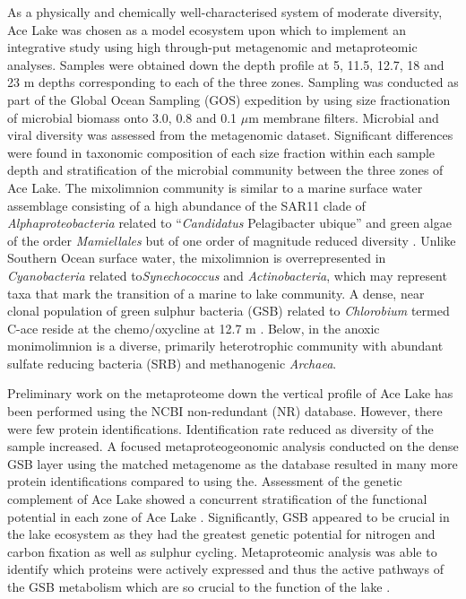 As a physically and chemically well-characterised system of moderate diversity, Ace Lake was chosen as a model ecosystem upon which to implement an integrative study using high through-put metagenomic and metaproteomic analyses.
Samples were obtained down the depth profile at 5, 11.5, 12.7, 18 and 23 m depths corresponding to each of the three zones.
Sampling was conducted as part of the Global Ocean Sampling (GOS) expedition \cite{Rusch2007} by using size fractionation of microbial biomass onto 3.0, 0.8 and 0.1 $\mu$m membrane filters.
Microbial and viral diversity was assessed from the metagenomic dataset.
Significant differences were found in taxonomic composition of each size fraction within each sample depth and stratification of the microbial community between the three zones of Ace Lake.
The mixolimnion community is similar to a marine surface water assemblage consisting of a high abundance of the SAR11 clade of \textit{Alphaproteobacteria} related to ``\textit{Candidatus} Pelagibacter ubique'' and green algae of the order \textit{Mamiellales} but of one order of magnitude reduced diversity \cite{Lauro2011}.
Unlike Southern Ocean surface water, the mixolimnion is overrepresented in \textit{Cyanobacteria} related to\textit{Synechococcus} and \textit{Actinobacteria}, which may represent taxa that mark the transition of a marine to lake community.
A dense, near clonal population of green sulphur bacteria (GSB) related to \textit{Chlorobium} termed C-ace reside at the chemo/oxycline at 12.7 m \cite{Ng2010, Lauro2011}.
Below, in the anoxic monimolimnion is a diverse, primarily heterotrophic community with abundant sulfate reducing bacteria (SRB) and methanogenic \textit{Archaea}.

Preliminary work on the metaproteome down the vertical profile of Ace Lake has been performed using the NCBI non-redundant (NR) database. %
However, there were few protein identifications.
Identification rate reduced as diversity of the sample increased.
A focused metaproteogeonomic analysis conducted on the dense GSB layer using the matched metagenome as the database resulted in many more protein identifications compared to using the\cite{Ng2010}.
Assessment of the genetic complement of Ace Lake showed a concurrent stratification of the functional potential in each zone of Ace Lake \cite{Lauro2011}.
Significantly, GSB appeared to be crucial in the lake ecosystem as they had the greatest genetic potential for nitrogen and carbon fixation as well as sulphur cycling\cite{Ng2010, Lauro2011}.
Metaproteomic analysis was able to identify which proteins were actively expressed and thus the active pathways of the GSB metabolism which are so crucial to the function of the lake \cite{Ng2010}.

